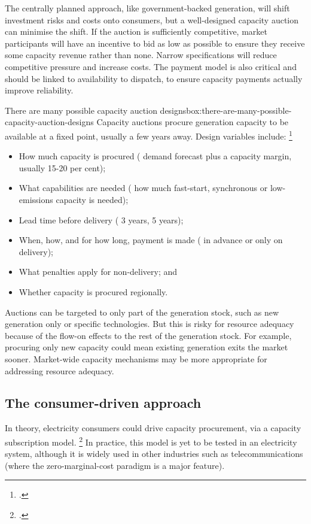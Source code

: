 \documentclass[FrontPage]{grattan}
\begin{document}
The centrally planned approach, like government-backed generation, will shift investment risks and costs onto consumers, but a well-designed capacity auction can minimise the shift. If the auction is sufficiently competitive, market participants will have an incentive to bid as low as possible to ensure they receive some capacity revenue rather than none. Narrow specifications will reduce competitive pressure and increase costs. The payment model is also critical and should be linked to availability to dispatch, to ensure capacity payments actually improve reliability.

\begin{smallbox}{There are many possible capacity auction designs}{box:there-are-many-possible-capacity-auction-designs}
Capacity auctions procure generation capacity to be available at a fixed point, usually a few years away. Design variables include:%
\footcite{CIGRE2016CapacityMechanisms}
\begin{itemize}
    \item How much capacity is procured (\eg{} demand forecast plus a capacity margin, usually 15-20 per cent);
    \item What capabilities are needed (\eg{} how much fast-start, synchronous or low-emissions capacity is needed);
    \item Lead time before delivery (\eg{} 3 years, 5 years);
    \item When, how, and for how long, payment is made (\eg{} in advance or only on delivery);
    \item What penalties apply for non-delivery; and
    \item Whether capacity is procured regionally.
\end{itemize}

Auctions can be targeted to only part of the generation stock, such as new generation only or specific technologies. But this is risky for resource adequacy because of the flow-on effects to the rest of the generation stock. For example, procuring only new capacity could mean existing generation exits the market sooner. Market-wide capacity mechanisms may be more appropriate for addressing resource adequacy.
\end{smallbox}

\subsection{The consumer-driven approach}\label{subsec:the-consumer-led-approach} 
In theory, electricity consumers could drive capacity procurement, via a capacity subscription model.%
\footcite{CIGRE2016CapacityMechanisms}
In practice, this model is yet to be tested in an electricity system, although it is widely used in other industries such as telecommunications (where the zero-marginal-cost paradigm is a major feature). 
\end{document}
